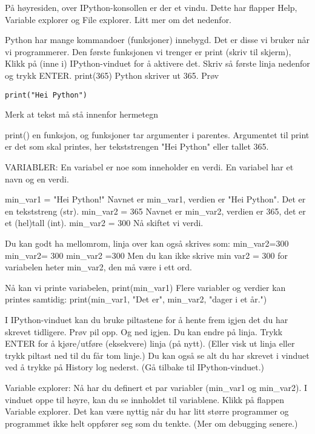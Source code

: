 På høyresiden, over IPython-konsollen er der et vindu.
Dette har flapper Help, Variable explorer og File explorer.
Litt mer om det nedenfor. 


Python har mange kommandoer (funksjoner) innebygd.
Det er disse vi bruker når vi programmerer. 
Den første funksjonen vi trenger er print (skriv til skjerm), 
Klikk på (inne i) IPython-vinduet for å aktivere det.
Skriv så første linja nedenfor og trykk ENTER.
print(365)
Python skriver ut 365.
Prøv

\begin{lstlisting}
print("Hei Python")
\end{lstlisting}

Merk at tekst må stå innenfor hermetegn


print() en funksjon, og funksjoner tar argumenter i parentes.
Argumentet til print er det som skal printes, her tekststrengen "Hei Python" eller tallet 365. 

VARIABLER: 
En variabel er noe som inneholder en verdi. 
En variabel har et navn og en verdi.

min{\_}var1 = "Hei Python!"
Navnet er min{\_}var1, verdien er "Hei Python". Det er en tekststreng (str). 
min{\_}var2 = 365
Navnet er min{\_}var2, verdien er 365, det er et (hel)tall (int). 
min{\_}var2 = 300
Nå skiftet vi verdi. 

Du kan godt ha mellomrom, linja over kan også skrives som: 
min{\_}var2=300
min{\_}var2= 300
min{\_}var2 =300
Men du kan ikke skrive
min var2 = 300
for variabelen heter min{\_}var2, den må være i ett ord. 

Nå kan vi printe variabelen, 
print(min{\_}var1)
Flere variabler og verdier kan printes samtidig: 
print(min{\_}var1, "Det er", min{\_}var2, "dager i et år.")

\iffalse

I IPython-vinduet kan du bruke piltastene for å hente frem igjen det du har skrevet tidligere. 
Prøv pil opp. Og ned igjen. 
Du kan endre på linja. 
Trykk ENTER for å kjøre/utføre (eksekvere) linja (på nytt).
(Eller visk ut linja eller trykk piltast ned til du får tom linje.)
Du kan også se alt du har skrevet i vinduet ved å trykke på History log nederst.
(Gå tilbake til IPython-vinduet.) 


Variable explorer:
Nå har du definert et par variabler (min_var1 og min_var2).
I vinduet oppe til høyre, kan du se innholdet til variablene. 
Klikk på flappen Variable explorer.
Det kan være nyttig når du har litt større programmer og programmet ikke helt
oppfører seg som du tenkte.
(Mer om debugging senere.) 


